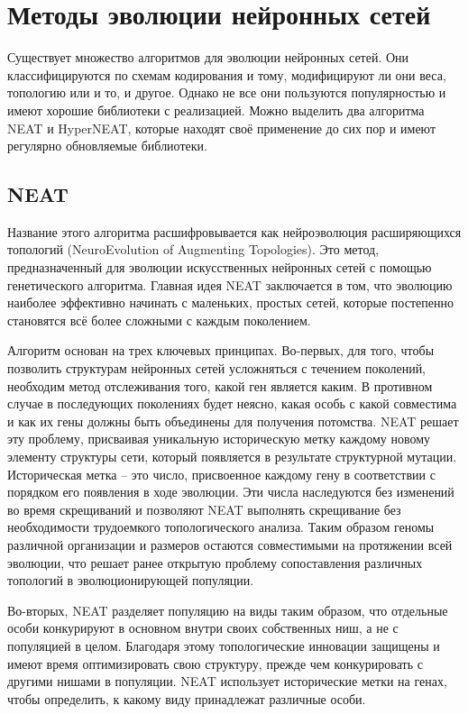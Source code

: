 ﻿%
\section{Методы эволюции нейронных сетей}\label{sec:evolutionMethods}

Существует множество алгоритмов для эволюции нейронных сетей. Они классифицируются по схемам кодирования и тому, модифицируют ли они веса, топологию или и то, и другое. Однако не все они пользуются популярностью и имеют хорошие библиотеки с реализацией. Можно выделить два алгоритма NEAT\cite{s1} и HyperNEAT\cite{s1}, которые находят своё применение до сих пор и имеют регулярно обновляемые библиотеки.

\subsection{NEAT}

Название этого алгоритма расшифровывается как нейроэволюция расширяющихся топологий (NeuroEvolution of Augmenting Topologies). Это метод, предназначенный для эволюции искусственных нейронных сетей с помощью генетического алгоритма. Главная идея NEAT заключается в том, что эволюцию наиболее эффективно начинать с маленьких, простых сетей, которые постепенно становятся всё более сложными с каждым поколением.

Алгоритм основан на трех ключевых принципах. Во-первых, для того, чтобы позволить структурам нейронных сетей усложняться с течением поколений, необходим метод отслеживания того, какой ген является каким. В противном случае в последующих поколениях будет неясно, какая особь с какой совместима и как их гены должны быть объединены для получения потомства. NEAT решает эту проблему, присваивая уникальную историческую метку каждому новому элементу структуры сети, который появляется в результате структурной мутации. Историческая метка – это число, присвоенное каждому гену в соответствии с порядком его появления в ходе эволюции. Эти числа наследуются без изменений во время скрещиваний и позволяют NEAT выполнять скрещивание без необходимости трудоемкого топологического анализа. Таким образом геномы различной организации и размеров остаются совместимыми на протяжении всей эволюции, что решает ранее открытую проблему сопоставления различных топологий в эволюционирующей популяции. 

Во-вторых, NEAT разделяет популяцию на виды таким образом, что отдельные особи конкурируют в основном внутри своих собственных ниш, а не с популяцией в целом. Благодаря этому топологические инновации защищены и имеют время оптимизировать свою структуру, прежде чем конкурировать с другими нишами в популяции. NEAT использует исторические метки на генах, чтобы определить, к какому виду принадлежат различные особи. 

